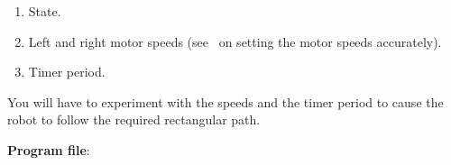 \begin{enumerate}
\item State.
\item Left and right motor speeds (see~\pageref{s.sliders} on setting
the motor speeds accurately).
\item Timer period.
\end{enumerate}

You will have to experiment with the speeds and the timer period to
cause the robot to follow the required rectangular path.

\bigskip

\textbf{Program file}: 
